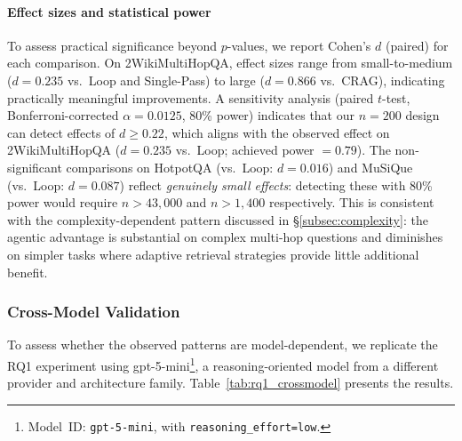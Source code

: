 \paragraph{Effect sizes and statistical power}
To assess practical significance beyond $p$-values, we report Cohen's $d$ (paired) for each comparison.
On 2WikiMultiHopQA, effect sizes range from small-to-medium ($d = 0.235$ vs.\ Loop and Single-Pass) to large ($d = 0.866$ vs.\ CRAG), indicating practically meaningful improvements.
A sensitivity analysis (paired $t$-test, Bonferroni-corrected $\alpha = 0.0125$, 80\% power) indicates that our $n = 200$ design can detect effects of $d \geq 0.22$, which aligns with the observed effect on 2WikiMultiHopQA ($d = 0.235$ vs.\ Loop; achieved power $= 0.79$).
The non-significant comparisons on HotpotQA (vs.\ Loop: $d = 0.016$) and MuSiQue (vs.\ Loop: $d = 0.087$) reflect \emph{genuinely small effects}: detecting these with 80\% power would require $n > 43{,}000$ and $n > 1{,}400$ respectively.
This is consistent with the complexity-dependent pattern discussed in \S\ref{subsec:complexity}: the agentic advantage is substantial on complex multi-hop questions and diminishes on simpler tasks where adaptive retrieval strategies provide little additional benefit.

\subsubsection{Cross-Model Validation}
\label{subsubsec:crossmodel}

To assess whether the observed patterns are model-dependent, we replicate the RQ1 experiment using gpt-5-mini\footnote{Model~ID: \texttt{gpt-5-mini}, with \texttt{reasoning\_effort=low}.}, a reasoning-oriented model from a different provider and architecture family.
Table~\ref{tab:rq1_crossmodel} presents the results.

